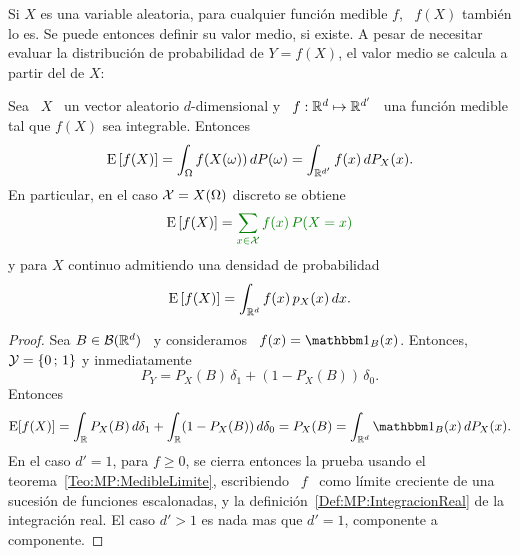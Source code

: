 Si $X$ es una variable aleatoria, para cualquier funci\'on medible $f$, \ $f(X)$
tambi\'en lo es.   Se puede entonces definir su valor medio,  si existe. A pesar
de necesitar evaluar  la distribuci\'on de probabilidad de $Y  = f(X)$, el valor
medio se calcula a partir del de $X$:
%
\begin{teorema}
\label{Teo:MP:Transferencia}
%
  Sea  \ $X$  \ un  vector  aleatorio $d$-dimensional  y \  $f: \mathbb{R}^d  \mapsto
  \mathbb{R}^{d'}$ \ una funci\'on medible tal que $f(X)$ sea integrable. Entonces
  \[
  \operatorname{E}\left[   f(X)  \right]   =  \int_\Omega   f(X(\omega))  \,   dP(\omega)  =
  \int_{\mathbb{R}^{d'}} f(x) \, dP_X(x).
  \]
  En particular, en el caso $\mathcal{X} = X(\Omega)$ discreto se obtiene
  \[
  \Esp\left[ f(X) \right] = \modif{\sum_{x \in \X} f(x) \, P(X = x)}
  \]
  y para $X$ continuo admitiendo una densidad de probabilidad
  \[
  \operatorname{E}\left[ f(X) \right] = \int_{\mathbb{R}^d} f(x) \, p_X(x) \, dx.
  \]
\end{teorema}
%
\begin{proof}
  Sea $B \in \mathcal{B}(\mathbb{R}^d)$ \ y consideramos \ $f(x) = \un_B(x)$. Entonces, $\mathcal{Y}
  = \{  0 \, ; \,  1 \}$ y inmediatamente
  \[
  P_Y = P_X(B) \, \delta_1 + (1-P_X(B)) \, \delta_0.
  \]
  Entonces
  \[
  \Esp[f(X)]  =  \int_\Rset  P_X(B)  \,  d\delta_1 +  \int_\Rset  (1-P_X(B))  \,
  d\delta_0 = P_X(B) = \int_{\Rset^d} \un_B(x) \, dP_X(x).
  \]
  En el caso  $d' = 1$, para $f  \ge 0$, se cierra entonces la  prueba usando el
  teorema~\ref{Teo:MP:MedibleLimite},
  escribiendo \  $f$ \  como l\'imite creciente  de una sucesi\'on  de funciones
  escalonadas,    y   la    definici\'on~\ref{Def:MP:IntegracionReal}    de   la
  integraci\'on real. El  caso $d' > 1$ es  nada mas que $d' =  1$, componente a
  componente.
\end{proof}


